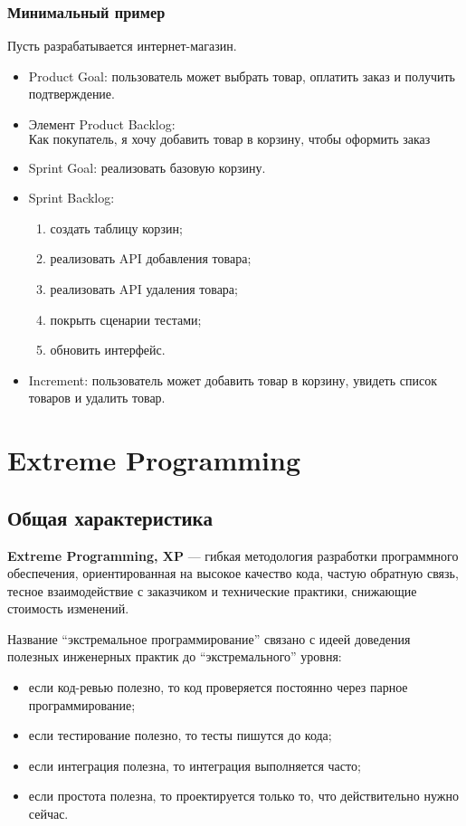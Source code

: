 \documentclass[12pt,a4paper]{article}
\begin{document}
\subsubsection*{Минимальный пример}

Пусть разрабатывается интернет-магазин.

\begin{itemize}
    \item Product Goal: пользователь может выбрать товар, оплатить заказ и получить подтверждение.
    \item Элемент Product Backlog:
    \[
    \text{Как покупатель, я хочу добавить товар в корзину, чтобы оформить заказ позже.}
    \]
    \item Sprint Goal: реализовать базовую корзину.
    \item Sprint Backlog:
    \begin{enumerate}
        \item создать таблицу корзин;
        \item реализовать API добавления товара;
        \item реализовать API удаления товара;
        \item покрыть сценарии тестами;
        \item обновить интерфейс.
    \end{enumerate}
    \item Increment: пользователь может добавить товар в корзину, увидеть список товаров и удалить товар.
\end{itemize}

\section{Extreme Programming}

\subsection{Общая характеристика}

\textbf{Extreme Programming, XP} --- гибкая методология разработки программного обеспечения, ориентированная на высокое качество кода, частую обратную связь, тесное взаимодействие с заказчиком и технические практики, снижающие стоимость изменений.

Название ``экстремальное программирование'' связано с идеей доведения полезных инженерных практик до ``экстремального'' уровня:
\begin{itemize}
    \item если код-ревью полезно, то код проверяется постоянно через парное программирование;
    \item если тестирование полезно, то тесты пишутся до кода;
    \item если интеграция полезна, то интеграция выполняется часто;
    \item если простота полезна, то проектируется только то, что действительно нужно сейчас.
\end{itemize}
\end{document}
